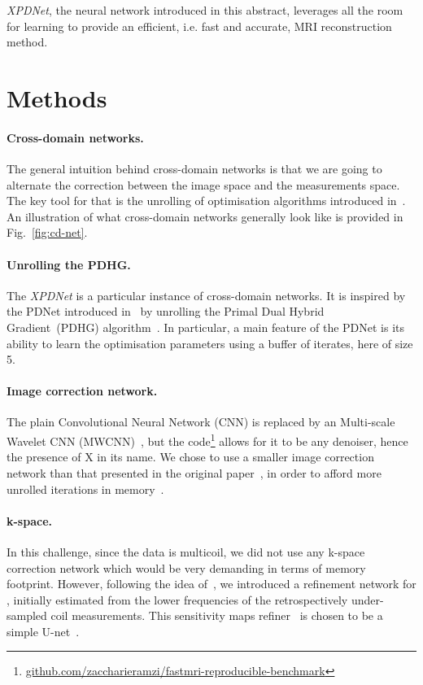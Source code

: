 \documentclass{article}
\begin{document}
\emph{XPDNet}, the neural network introduced in this abstract, leverages all the room for learning to provide an efficient, i.e. fast and accurate, MRI reconstruction method.
 
\section{Methods}

\paragraph{Cross-domain networks.}
The general intuition behind cross-domain networks is that we are going to alternate the correction between the image space and the measurements space.
The key tool for that is the unrolling of optimisation algorithms introduced in~\cite{Gregor2010}.
An illustration of what cross-domain networks generally look like is provided in Fig.~\ref{fig:cd-net}.

\paragraph{Unrolling the PDHG.}The \emph{XPDNet} is a particular instance of cross-domain networks.
It is inspired by the PDNet introduced in~\cite{Adler2018} by unrolling the Primal Dual Hybrid Gradient~(PDHG) algorithm~\cite{Chambolle2011}.
In particular, a main feature of the PDNet is its ability to learn the optimisation parameters using a buffer of iterates, here of size 5.

\paragraph{Image correction network.} The plain Convolutional Neural Network (CNN) is replaced by an Multi-scale Wavelet CNN (MWCNN)~\cite{Liu}, but the code\footnote{\href{https://github.com/zaccharieramzi/fastmri-reproducible-benchmark}{github.com/zaccharieramzi/fastmri-reproducible-benchmark}} allows for it to be any denoiser, hence the presence of X in its name.
We chose to use a smaller image correction network than that presented in the original paper~\cite{Liu}, in order to afford more unrolled iterations in memory~\cite{Ramzi2020BenchmarkingDatasets}.


\paragraph{k-space.} In this challenge, since the data is multicoil, we did not use any k-space correction network which would be very demanding in terms of memory footprint.
However, following the idea of~\cite{Sriram2020End-to-EndReconstruction}, we introduced a refinement network for , initially estimated from the lower frequencies of the retrospectively under-sampled coil measurements.
This sensitivity maps refiner~\cite{Sriram2020End-to-EndReconstruction} is chosen to be a simple U-net~\cite{Ronneberger}.
\end{document}
